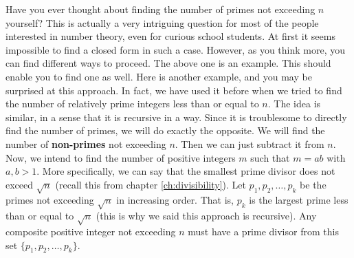 \documentclass{subfiles}
\begin{document}
		Have you ever thought about finding the number of primes not exceeding $n$ yourself? This is actually a very intriguing question for most of the people interested in number theory, even for curious school students. At first it seems impossible to find a closed form in such a case. However, as you think more, you can find different ways to proceed. The above one is an example. This should enable you to find one as well. Here is another example, and you may be surprised at this approach. In fact, we have used it before when we tried to find the number of relatively prime integers less than or equal to $n$. The idea is similar, in a sense that it is recursive in a way. Since it is troublesome to directly find the number of primes, we will do exactly the opposite. We will find the number of \textbf{non-primes} not exceeding $n$. Then we can just subtract it from $n$. Now, we intend to find the number of positive integers $m$ such that $m=ab$ with $a,b>1$. More specifically, we can say that the smallest prime divisor does not exceed $\sqrt{n}$ (recall this from chapter \eqref{ch:divisibility}). Let $p_1,p_2,\ldots,p_k$ be the primes not exceeding $\sqrt{n}$ in increasing order. That is, $p_k$ is the largest prime less than or equal to $\sqrt{n}$ (this is why we said this approach is recursive). Any composite positive integer not exceeding $n$ must have a prime divisor from this set $\{p_1,p_2,\ldots,p_k\}$.
\end{document}
